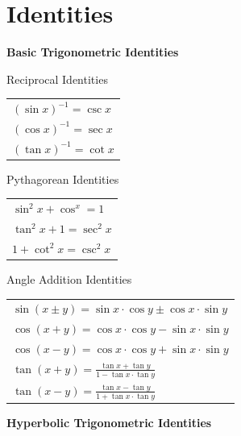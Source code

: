 \documentclass{article}
\begin{document}
\vspace{0.5cm}
\rhead{\leftmark}
\cfoot{}

\text{}

\section{Identities}
\begin{center}

\textbf{Basic Trigonometric Identities}

\begin{minipage}{0.3\linewidth}
Reciprocal Identities\\
\begin{tabular}{l}
$(\sin x)^{-1} = \csc x$\\
$(\cos x)^{-1} = \sec x$\\
$(\tan x)^{-1} = \cot x$
\end{tabular}
\end{minipage}
\begin{minipage}{0.3\linewidth}
Pythagorean Identities\\
\begin{tabular}{l}
$\sin^2 x + \cos^x = 1$\\
$\tan^2 x + 1 = \sec^2 x$\\
$1 + \cot^2 x = \csc^2 x$
\end{tabular}
\end{minipage}
\begin{minipage}{0.3\linewidth}
Angle Addition Identities\\
\begin{tabular}{l}
$\sin(x \pm y) = \sin x \cdot \cos y \pm \cos x \cdot \sin y$\\
$\cos(x + y) = \cos x \cdot \cos y - \sin x \cdot \sin y$\\
$\cos(x - y) = \cos x \cdot \cos y + \sin x \cdot \sin y$\\
$\tan(x + y) = \displaystyle\frac{\tan x + \tan y}{1 - \tan x \cdot \tan y}$\\
$\tan(x - y) = \displaystyle\frac{\tan x - \tan y}{1 + \tan x \cdot \tan y}$
\end{tabular}
\end{minipage}

\vspace{0.5cm}

\textbf{Hyperbolic Trigonometric Identities}

\vspace{0.3cm}


\end{center}
\end{document}
